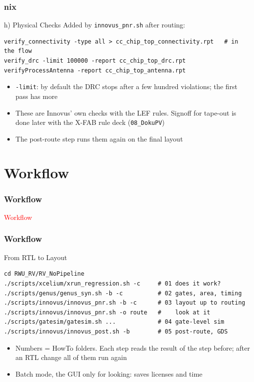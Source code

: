 \documentclass{beamer}
\newcommand{\astitle}{nix}
\newcommand{\assubtitle}{nix}
\newcommand{\cmd}[1]{\texttt{#1}}
\begin{document}
\renewcommand{\assubtitle}{h) Physical Checks}
\begin{frame}[fragile]
\frametitle{\astitle}
\begin{block}{\assubtitle}
  \footnotesize
  Added by \cmd{innovus\_pnr.sh} after routing:
\begin{lstlisting}[style=sh]
verify_connectivity -type all > cc_chip_top_connectivity.rpt   # in the flow
verify_drc -limit 100000 -report cc_chip_top_drc.rpt
verifyProcessAntenna -report cc_chip_top_antenna.rpt
\end{lstlisting}
  \begin{itemize}
    \item \cmd{-limit}: by default the DRC stops after a few hundred
      violations; the first pass has more
    \item These are Innovus' own checks with the LEF rules. Signoff for
      tape-out is done later with the X-FAB rule deck (\cmd{08\_DokuPV})
    \item The post-route step runs them again on the final layout
  \end{itemize}
\end{block}
\end{frame}

\section{Workflow}
\renewcommand{\astitle}{Workflow}
\begin{frame}
\frametitle{\astitle}
\textcolor{red}{Workflow}
\end{frame}

\renewcommand{\assubtitle}{From RTL to Layout}
\begin{frame}[fragile]
\frametitle{\astitle}
\begin{block}{\assubtitle}
\begin{lstlisting}[style=sh]
cd RWU_RV/RV_NoPipeline
./scripts/xcelium/xrun_regression.sh -c     # 01 does it work?
./scripts/genus/genus_syn.sh -b -c          # 02 gates, area, timing
./scripts/innovus/innovus_pnr.sh -b -c      # 03 layout up to routing
./scripts/innovus/innovus_pnr.sh -o route   #    look at it
./scripts/gatesim/gatesim.sh ...            # 04 gate-level sim
./scripts/innovus/innovus_post.sh -b        # 05 post-route, GDS
\end{lstlisting}
  \begin{itemize}
    \item Numbers = HowTo folders. Each step reads the result of the step
      before; after an RTL change all of them run again
    \item Batch mode, the GUI only for looking: saves
      licenses and time
  \end{itemize}
\end{block}
\end{frame}
\end{document}
